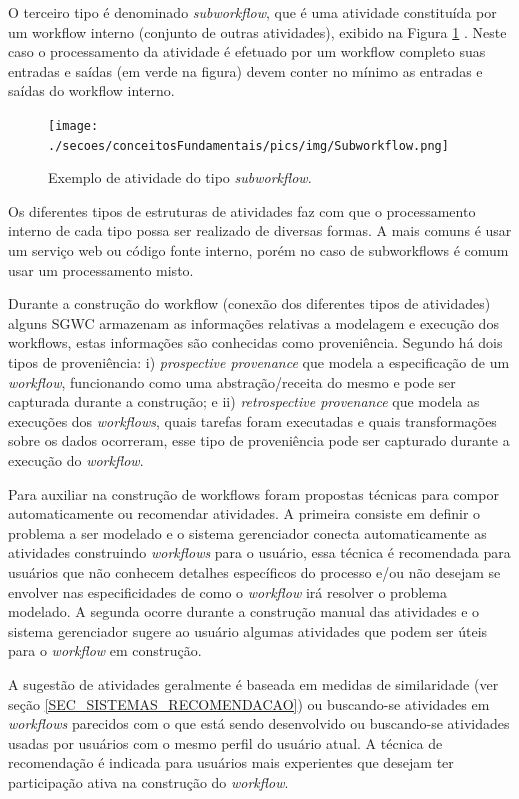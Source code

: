 O terceiro tipo é denominado \emph{subworkflow}, que é uma atividade constituída por um workflow interno (conjunto de outras atividades), exibido na Figura \ref{figura_atividade_subworkflow} \cite{medeiros_woodss_2005}. Neste caso o processamento da atividade é efetuado por um workflow completo suas entradas e saídas (em verde na figura) devem conter no mínimo as entradas e saídas do workflow interno.
\begin{figure}[!htb]
    \centering  
    \caption{Exemplo de atividade do tipo \emph{subworkflow}.}
    \texttt{[image: ./secoes/conceitosFundamentais/pics/img/Subworkflow.png]}    
	\label{figura_atividade_subworkflow}
\end{figure}
Os diferentes tipos de estruturas de atividades faz com que o processamento interno de cada tipo possa ser realizado de diversas formas. A mais comuns é usar um serviço web ou código fonte interno, porém no caso de subworkflows é comum usar um processamento misto. 

Durante a construção do workflow (conexão dos diferentes tipos de atividades) alguns SGWC armazenam as informações relativas a modelagem e execução dos workflows, estas informações são conhecidas como proveniência. Segundo  há dois tipos de proveniência: i) \emph{prospective provenance} que modela a especificação de um \emph{workflow}, funcionando como uma abstração/receita do mesmo e pode ser capturada durante a construção; e ii) \emph{retrospective provenance} que modela as execuções dos \emph{workflows}, quais tarefas foram executadas e quais transformações sobre os dados ocorreram, esse tipo de proveniência pode ser capturado durante a execução do \emph{workflow}.

Para auxiliar na construção de workflows foram propostas técnicas para compor automaticamente ou recomendar atividades. A primeira consiste em definir o problema a ser modelado e o sistema gerenciador conecta automaticamente as atividades construindo \emph{workflows} para o usuário, essa técnica é recomendada para usuários que não conhecem detalhes específicos do processo e/ou não desejam se envolver nas especificidades de como o \emph{workflow} irá resolver o problema modelado. A segunda ocorre durante a construção manual das atividades e o sistema gerenciador sugere ao usuário algumas atividades que podem ser úteis para o \emph{workflow} em construção. 

A sugestão de atividades geralmente é baseada em medidas de similaridade (ver seção \ref{SEC_SISTEMAS_RECOMENDACAO}) ou buscando-se atividades em \emph{workflows} parecidos com o que está sendo desenvolvido ou buscando-se atividades usadas por usuários com o mesmo perfil do usuário atual. A técnica de recomendação é indicada para usuários mais experientes que desejam ter participação ativa na construção do \emph{workflow}.


